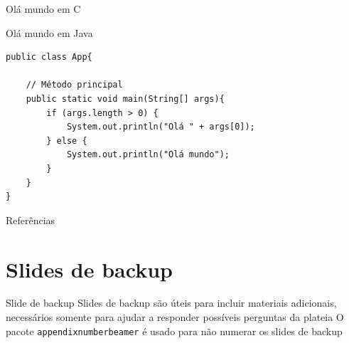 \documentclass[aspectratio=169]{beamer}
\begin{document}
\begin{frame}[fragile]{Olá mundo em C}
    
\end{frame}

\begin{frame}[fragile]{Olá mundo em Java}
\begin{lstlisting}[style=java, caption={Olá mundo em Java},label={cod:olajava}]
public class App{

    // Método principal
    public static void main(String[] args){
        if (args.length > 0) {
            System.out.println("Olá " + args[0]);
        } else {
            System.out.println("Olá mundo");
        }
    }
}
\end{lstlisting}
\end{frame}

\begin{frame}[allowframebreaks]{Referências}
    \nocite{*}
    \printbibliography
\end{frame}
    
%     
%     

\appendix

\section{Slides de backup}

\begin{frame}{Slide de backup}
    Slides de backup são úteis para incluir materiais adicionais, necessários somente para ajudar a responder possíveis perguntas da plateia
    \vfill
    O pacote \texttt{appendixnumberbeamer} é usado para não numerar os slides de backup
\end{frame}
\end{document}
